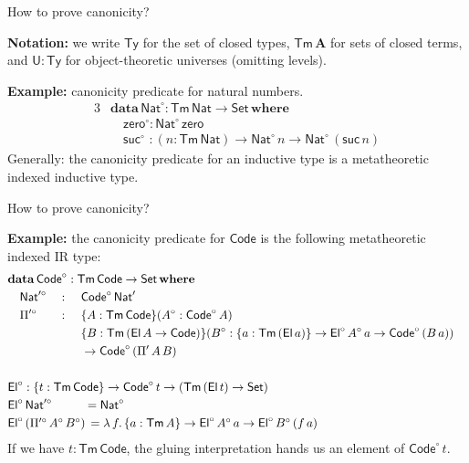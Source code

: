 \documentclass[dvipsnames,aspectratio=169]{beamer}
\newcommand{\ms}[1]{\mathsf{#1}}
\newcommand{\mbf}[1]{\mathbf{#1}}
\newcommand{\bs}[1]{\boldsymbol{#1}}
\newcommand{\data}{\mbf{data}}
\newcommand{\U}{\ms{U}}
\newcommand{\Set}{\ms{Set}}
\newcommand{\where}{\mbf{where}}
\newcommand{\Nat}{\ms{Nat}}
\newcommand{\zero}{\ms{zero}}
\newcommand{\suc}{\ms{suc}}
\newcommand{\El}{\ms{El}}
\newcommand{\Code}{\ms{Code}}
\newcommand{\Ty}{\ms{Ty}}
\newcommand{\Tm}{\ms{Tm}}
\newcommand{\w}{\circ}
\begin{document}
\begin{frame}{How to prove canonicity?}

\textbf{Notation:} we write $\bs{\Ty}$ for the set of closed types, $\bs{\Tm\,A}$ for sets of closed terms,
  and $\bs{\U : \Ty}$ for object-theoretic universes (omitting levels).
\vspace{1em}

\textbf{Example:} canonicity predicate for natural numbers.
\begin{alignat*}{3}
  &\data\,\Nat^\w : \Tm\,\Nat \to \Set\,\where\\
  & \quad \zero^\w : \Nat^\w\,\zero\\
  & \quad \suc^\w\,\,: (n : \Tm\,\Nat) \to \Nat^\w\,n \to \Nat^\w\,(\suc\,n)
\end{alignat*}
Generally: the canonicity predicate for an inductive type is a \alert{metatheoretic indexed inductive type}.


\end{frame}

\begin{frame}{How to prove canonicity?}

\textbf{Example:} the canonicity predicate for $\Code$ is the following \alert{metatheoretic indexed IR type}:
\begin{alignat*}{4}
  &\rlap{$\data\,\Code^\w : \Tm\,\Code \to \Set\,\where$}\\
  &\quad\Nat'^\w &&: \,\,&& \Code^\w\,\Nat'\\
  &\quad\Pi'^\w  &&: \,\,&&\{A : \Tm\,\Code\}(A^\w : \Code^\w\,A)\\
  &\quad         &&  && \{B : \Tm\,(\El\,A \to \Code)\}(B^\w : \{a : \Tm\,(\El\,a)\} \to \El^\w\,A^\w\,a \to \Code^\w\,(B\,a))\\
  &\quad         &&  && \to \Code^\w\,(\Pi'\,A\,B)\\
  &\rlap{}\\
  &\rlap{$\El^\w : \{t : \Tm\,\Code\} \to \Code^\w\,t \to (\Tm\,(\El\,t) \to \Set)$}\\
  &\rlap{$\El^\w\,\Nat'^\w \hspace{2.7em}= \Nat^\w$}  \\
  &\rlap{$\El^\w\,(\Pi'^\w\,A^\w\,B^\w)\,= \lambda\,f.\,\{a : \Tm\,A\} \to \El^\w\,A^\w\,a \to \El^\w\,B^\w\,(f\,a)$}
\end{alignat*}
If we have $t : \Tm\,\Code$, the gluing interpretation hands us an element of $\Code^\w\,t$.

\end{frame}
\end{document}
